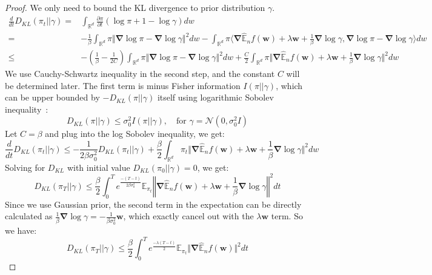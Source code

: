 \documentclass[final,12pt]{colt2018} %
\begin{document}
\begin{proof}
We only need to bound the KL divergence to prior distribution $\gamma$.
\begin{equation}
\begin{split}
\frac{d}{dt}D_{KL}(\pi_t||\gamma)=&\int_{\mathbb{R}^d} \frac{\partial \pi}{\partial t}(\log \pi+1-\log \gamma)dw\\
=&-\frac{1}{\beta}\int_{\mathbb{R}^d} \pi\Vert \bm{\nabla} \log \pi-\bm{\nabla}\log\gamma\Vert^2dw - \int_{\mathbb{R}^d} \pi\langle \bm{\nabla}\hat{\mathbb{E}}_n f(\bm{w})+\lambda \bm{w}+\frac{1}{\beta}\bm{\nabla} \log \gamma, \bm{\nabla} \log \pi-\bm{\nabla} \log \gamma\rangle dw\\
\leq &-\left(\frac{1}{\beta}-\frac{1}{2C}\right)\int_{\mathbb{R}^d} \pi\Vert \bm{\nabla} \log \pi-\bm{\nabla}\log\gamma\Vert^2dw+\frac{C}{2}\int_{\mathbb{R}^d} \pi \Vert \bm{\nabla}\hat{\mathbb{E}}_n f(\bm{w})+\lambda\bm{w}+\frac{1}{\beta}\bm{\nabla}\log \gamma\Vert^2dw
\end{split}
\end{equation}
We use Cauchy-Schwartz inequality in the second step, and the constant $C$ will be determined later.
The first term is minus Fisher information $I(\pi||\gamma)$, which can be upper bounded by $-D_{KL}(\pi||\gamma)$ itself using logarithmic Sobolev inequality~\citep{gross1975logarithmic,markowich2000trend}:
\begin{equation}
D_{KL}(\pi||\gamma)\leq \sigma_0^2I(\pi||\gamma),\quad\text{for } \gamma=\mathcal{N}(0,\sigma_0^2I)
\end{equation}
Let $C=\beta$ and plug into the log Sobolev inequality, we get:
\begin{equation}
  \frac{d}{dt}D_{KL}(\pi_t||\gamma)\leq -\frac{1}{2\beta\sigma_0^2}D_{KL}(\pi_t||\gamma)+\frac{\beta}{2}\int_{\mathbb{R}^d} \pi_t \Vert \bm{\nabla}\hat{\mathbb{E}}_n f(\bm{w})+\lambda \bm{w}+\frac{1}{\beta}\bm{\nabla}\log \gamma\Vert^2dw
\end{equation}
Solving for $D_{KL}$ with initial value $D_{KL}(\pi_0||\gamma)=0$, we get:
\begin{equation}
  D_{KL}(\pi_T||\gamma)\leq \frac{\beta}{2}\int_{0}^T e^{\frac{-(T-t)}{2\beta \sigma_0^2}}\mathbb{E}_{\pi_t} \left\Vert \bm{\nabla}\hat{\mathbb{E}}_n f(\bm{w})+\lambda\bm{w}+\frac{1}{\beta}\bm{\nabla}\log \gamma\right\Vert^2dt
\end{equation}
Since we use Gaussian prior, the second term in the expectation can be directly calculated as $\frac{1}{\beta}\bm{\nabla}\log \gamma=-\frac{1}{\beta\sigma_0^2}\bm{w}$, which exactly cancel out with the $\lambda\bm{w}$ term. So we have:
\begin{equation}
  D_{KL}(\pi_T||\gamma)\leq \frac{\beta}{2}\int_{0}^T e^{\frac{-\lambda(T-t)}{2}}\mathbb{E}_{\pi_t} \Vert \bm{\nabla}\hat{\mathbb{E}}_n f(\bm{w})\Vert^2dt
\end{equation}
\end{proof}
\end{document}

